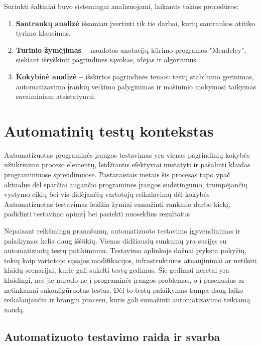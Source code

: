 \documentclass[
]{VUMIFPSkursinis}
\begin{document}
Surinkti šaltiniai buvo sistemingai analizuojami, laikantis tokios procedūros:

\begin{enumerate}
    \item \textbf{Santraukų analizė}  išsamiau įvertinti tik tie darbai, kurių santraukos atitiko tyrimo klausimus.
    \item \textbf{Turinio žymėjimas –  } naudotos anotacijų kūrimo programos "Mendeley", siekiant išryškinti pagrindines sąvokas, idėjas ir algoritmus.
    \item \textbf{Kokybinė analizė –} išskirtos pagrindinės temos: testų stabilumo gerinimas, automatizavimo įrankių veikimo palyginimas ir mašininio mokymosi taikymas savaiminiam atsistatymui.
\end{enumerate}

\section{Automatinių testų kontekstas}

Automatizuotas programinės įrangos testavimas yra vienas pagrindinių kokybės užtikrinimo proceso elementų, leidžiantis efektyviai nustatyti ir pašalinti klaidas programiniuose sprendimuose. Pastaraisiais metais šis procesas tapo ypač aktualus dėl sparčiai augančio programinės įrangos sudėtingumo, trumpėjančių vystymo ciklų bei vis didėjančių vartotojų reikalavimų dėl kokybės \cite{myers2011} Automatizuotas testavimas leidžia žymiai sumažinti rankinio darbo kiekį, padidinti testavimo apimtį bei pasiekti nuoseklius rezultatus \cite{meszaros2007}

Nepaisant reikšmingų pranašumų, automatizuoto testavimo įgyvendinimas ir palaikymas kelia daug iššūkių. Vienas didžiausių sunkumų yra susijęs su automatizuotų testų patikimumu. Testavimo aplinkoje dažnai įvyksta pokyčių, tokių kaip vartotojo sąsajos modifikacijos, infrastruktūros atnaujinimai ar netikėti klaidų scenarijai, kurie gali sukelti testų gedimus. Šie gedimai neretai yra klaidingi, nes jie nurodo ne į programinės įrangos problemas, o į pasenusius ar netinkamai sukonfigūruotus testus. Dėl to testų palaikymas tampa daug laiko reikalaujančiu ir brangiu procesu, kuris gali sumažinti automatizavimo teikiamą naudą.

\subsection{Automatizuoto testavimo raida ir svarba}
\end{document}
